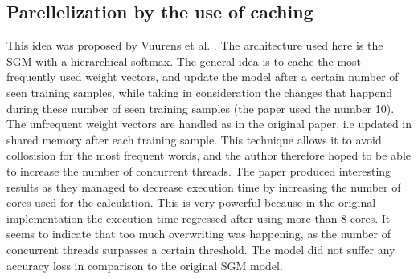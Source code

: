 \subsection{Parellelization by the use of caching}
This idea was proposed by Vuurens et al. \citep{efficient}. The architecture used here is the SGM with a hierarchical softmax. 
The general idea is to cache the most frequently used weight vectors, and update the model after a certain number of seen training samples, while taking in consideration the changes that happend during these number of seen training samples (the paper used the number 10). The unfrequent weight vectors are handled as in the original paper, i.e updated in shared memory after each training sample. This technique  allows it to avoid collosision for the most frequent words, and the author therefore hoped to be able to increase the number of concurrent threads. The paper produced interesting results as they managed to decrease execution time by increasing the number of cores used for the calculation. This is very powerful because in the original implementation the execution time regressed after using more than 8 cores. It seems to indicate that too much overwriting was happening, as the number of concurrent threads surpasses a certain threshold. The model did not suffer any accuracy loss in comparison to the original SGM model.

